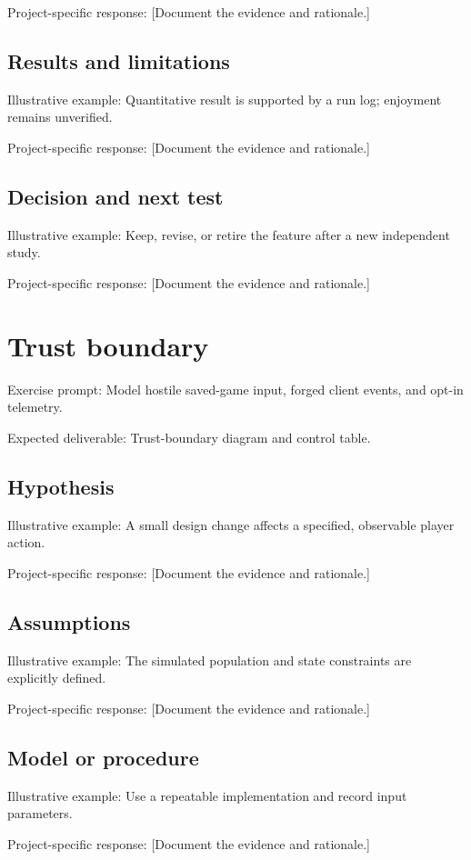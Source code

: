 \documentclass[11pt]{article}
\begin{document}
Project-specific response: [Document the evidence and rationale.]


\subsection{Results and limitations}
Illustrative example: Quantitative result is supported by a run log; enjoyment remains unverified.

Project-specific response: [Document the evidence and rationale.]


\subsection{Decision and next test}
Illustrative example: Keep, revise, or retire the feature after a new independent study.

Project-specific response: [Document the evidence and rationale.]


\section{Trust boundary}
Exercise prompt: Model hostile saved-game input, forged client events, and opt-in telemetry.

Expected deliverable: Trust-boundary diagram and control table.


\subsection{Hypothesis}
Illustrative example: A small design change affects a specified, observable player action.

Project-specific response: [Document the evidence and rationale.]


\subsection{Assumptions}
Illustrative example: The simulated population and state constraints are explicitly defined.

Project-specific response: [Document the evidence and rationale.]


\subsection{Model or procedure}
Illustrative example: Use a repeatable implementation and record input parameters.

Project-specific response: [Document the evidence and rationale.]
\end{document}
